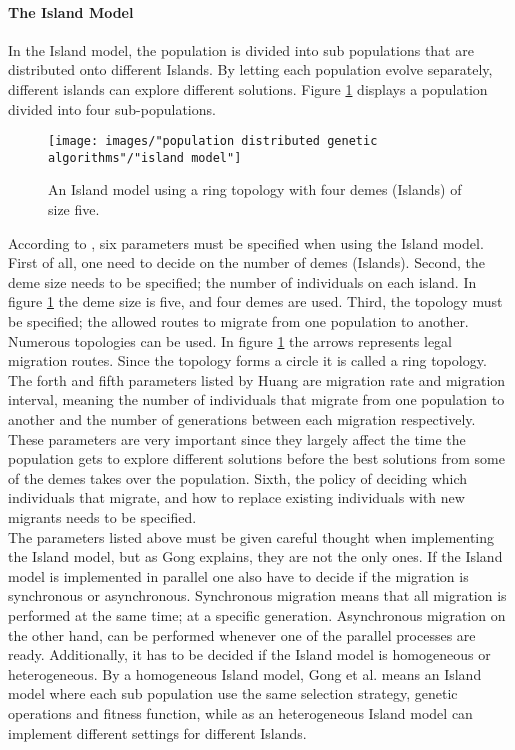 \paragraph*{The Island Model}
In the Island model, the population is divided into sub populations that are distributed onto different Islands. By letting each population evolve separately, different islands can explore different solutions. Figure \ref{Island model} displays a population divided into four sub-populations. \\ 


\begin{figure}[h!]
\begin{center}
\texttt{[image: images/"population distributed genetic algorithms"/"island model"]}
\caption{An Island model using a ring topology with four demes (Islands) of size five. \citep{Gong}}
\label{Island model}
\end{center}
\end{figure}


\noindent According to \cite{Huang}, six parameters must be specified when using the Island model. First of all, one need to decide on the number of demes (Islands). Second, the deme size needs to be specified; the number of individuals on each island. In figure \ref{Island model} the deme size is five, and four demes are used. Third, the topology must be specified; the allowed routes to migrate from one population to another. Numerous topologies can be used. In figure \ref{Island model} the arrows represents legal migration routes. Since the topology forms a circle it is called a ring topology. The forth and fifth parameters listed by Huang are migration rate and migration interval, meaning the number of individuals that migrate from one population to another and the number of generations between each migration respectively. These parameters are very important since they largely affect the time the population gets to explore different solutions before the best solutions from some of the demes takes over the population. Sixth, the policy of deciding which individuals that migrate, and how to replace existing individuals with new migrants needs to be specified. \\


\noindent The parameters listed above must be given careful thought when implementing the Island model, but as Gong explains, they are not the only ones. If the Island model is implemented in parallel one also have to decide if the migration is synchronous or asynchronous. Synchronous migration means that all migration is performed at the same time; at a specific generation. Asynchronous migration on the other hand, can be performed whenever one of the parallel processes are ready. Additionally, it has to be decided if the Island model is homogeneous or heterogeneous. By a homogeneous Island model, Gong et al. means an Island model where each sub population use the same selection strategy, genetic operations and fitness function, while as an heterogeneous Island model can implement different settings for different Islands.


